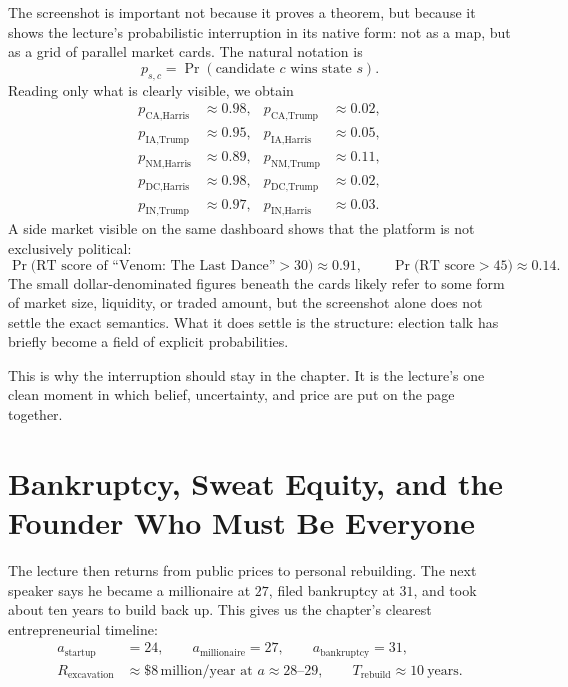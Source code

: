 The screenshot is important not because it proves a theorem, but because it shows the lecture's probabilistic interruption in its native form: not as a map, but as a grid of parallel market cards. The natural notation is
\begin{equation}
p_{s,c}=\Pr(\text{candidate }c\text{ wins state }s).
\end{equation}
Reading only what is clearly visible, we obtain
\begin{align}
p_{\text{CA,Harris}} &\approx 0.98, & p_{\text{CA,Trump}} &\approx 0.02,\\
p_{\text{IA,Trump}} &\approx 0.95, & p_{\text{IA,Harris}} &\approx 0.05,\\
p_{\text{NM,Harris}} &\approx 0.89, & p_{\text{NM,Trump}} &\approx 0.11,\\
p_{\text{DC,Harris}} &\approx 0.98, & p_{\text{DC,Trump}} &\approx 0.02,\\
p_{\text{IN,Trump}} &\approx 0.97, & p_{\text{IN,Harris}} &\approx 0.03.
\end{align}
A side market visible on the same dashboard shows that the platform is not exclusively political:
\begin{equation}
\Pr\!\bigl(\text{RT score of ``Venom: The Last Dance''}>30\bigr)\approx 0.91,
\qquad
\Pr\!\bigl(\text{RT score}>45\bigr)\approx 0.14.
\end{equation}
The small dollar-denominated figures beneath the cards likely refer to some form of market size, liquidity, or traded amount, but the screenshot alone does not settle the exact semantics. What it does settle is the structure: election talk has briefly become a field of explicit probabilities.

This is why the interruption should stay in the chapter. It is the lecture's one clean moment in which belief, uncertainty, and price are put on the page together.

\section{Bankruptcy, Sweat Equity, and the Founder Who Must Be Everyone}

The lecture then returns from public prices to personal rebuilding. The next speaker says he became a millionaire at \(27\), filed bankruptcy at \(31\), and took about ten years to build back up. This gives us the chapter's clearest entrepreneurial timeline:
\begin{align}
a_{\text{startup}} &= 24,\qquad
a_{\text{millionaire}} = 27,\qquad
a_{\text{bankruptcy}} = 31,\\
R_{\text{excavation}} &\approx \$8\,\text{million/year at } a\approx 28\text{--}29,\qquad
T_{\text{rebuild}} \approx 10\ \text{years}.
\end{align}

